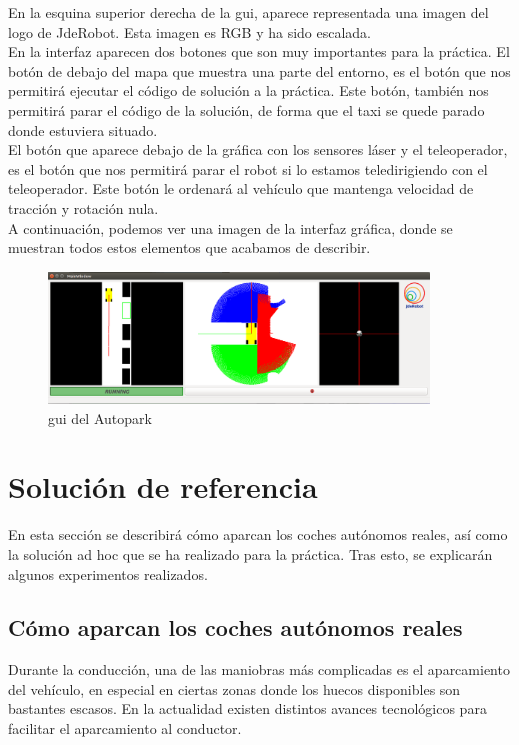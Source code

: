 En la esquina superior derecha de la \acrshort{gui}, aparece representada una imagen del logo de JdeRobot. Esta imagen es RGB y ha sido escalada.\\

En la interfaz aparecen dos botones que son muy importantes para la práctica. El botón de debajo del mapa que muestra una parte del entorno, es el botón que nos permitirá ejecutar el código de solución a la práctica. Este botón, también nos permitirá parar el código de la solución, de forma que el taxi se quede parado donde estuviera situado.\\

El botón que aparece debajo de la gráfica con los sensores láser y el teleoperador, es el botón que nos permitirá parar el robot si lo estamos teledirigiendo con el teleoperador. Este botón le ordenará al vehículo que mantenga velocidad de tracción y rotación nula.\\

A continuación, podemos ver una imagen de la interfaz gráfica, donde se muestran todos estos elementos que acabamos de describir.

\begin{figure}[H]
  \begin{center}
    \includegraphics[width=0.9\textwidth]{figures/Autopark/GUI_Autopark.png}
		\caption{\acrshort{gui} del Autopark}
		\label{fig.GUI_Autopark}
		\end{center}
\end{figure}

\section{Solución de referencia}
En esta sección se describirá cómo aparcan los coches autónomos reales, así como la solución ad hoc que se ha realizado para la práctica. Tras esto, se explicarán algunos experimentos realizados. 

\subsection{Cómo aparcan los coches autónomos reales}
Durante la conducción, una de las maniobras más complicadas es el aparcamiento del vehículo, en especial en ciertas zonas donde los huecos disponibles son bastantes escasos. En la actualidad existen distintos avances tecnológicos para facilitar el aparcamiento al conductor.\\


